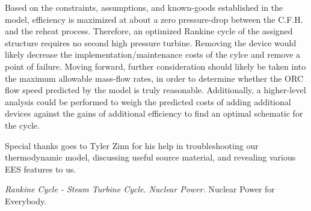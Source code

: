 \documentclass[10pt,cleanfoot]{asme2ej}
\begin{document}
Based on the constraints, assumptions, and known-goods established in the model, efficiency is maximized at about a zero pressure-drop between the C.F.H. and the reheat process. Therefore, an optimized Rankine cycle of the assigned structure requires no second high pressure turbine. Removing the device would likely decrease the implementation/maintenance costs of the cylce and remove a point of failure. Moving forward, further consideration should likely be taken into the maximum allowable mass-flow rates, in order to determine whether the ORC flow speed predicted by the model is truly reasonable. Additionally, a higher-level analysis could be performed to weigh the predicted costs of adding additional devices against the gains of additional efficiency to find an optimal schematic for the cycle.

\begin{acknowledgment}
Special thanks goes to Tyler Zinn for his help in troubleshooting our thermodynamic model, discussing useful source material, and revealing various EES features to us.
\end{acknowledgment}


\begin{thebibliography}{12}
 {\em Rankine Cycle - Steam Turbine Cycle.}
{\em Nuclear Power.}
{Nuclear Power for Everybody.}
\end{thebibliography}




\end{document}
